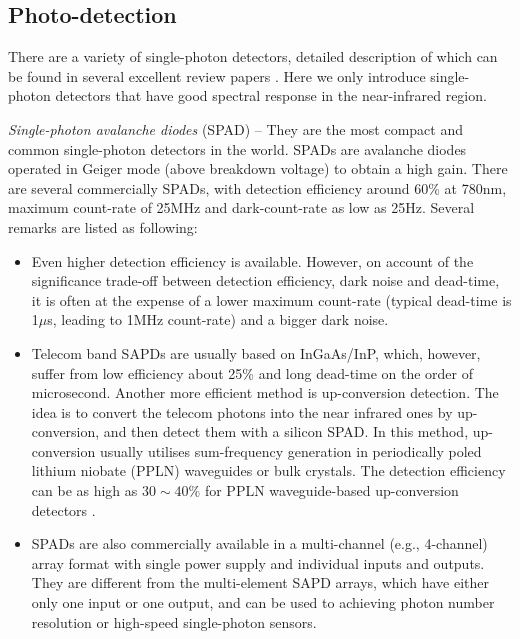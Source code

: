 %
%

\subsection{Photo-detection} 

There are a variety of single-photon detectors, detailed description of which can be found in several excellent review papers \cite{bib:eisaman2011, bib:hadfield2009}. Here we only introduce single-photon detectors that have good spectral response in the near-infrared region.

\textit{Single-photon avalanche diodes} (SPAD) -- They are the most compact and common single-photon detectors in the world. SPADs are avalanche diodes operated in Geiger mode (above breakdown voltage) to obtain a high gain. There are several commercially SPADs, with detection efficiency around 60\% at 780nm, maximum count-rate of 25MHz and dark-count-rate as low as 25Hz. Several remarks are listed as following:

\begin{itemize}
    \item Even higher detection efficiency is available. However, on account of the significance trade-off between detection efficiency, dark noise and dead-time, it is often at the expense of a lower maximum count-rate (typical dead-time is 1$\mu$s, leading to 1MHz count-rate) and a bigger dark noise.

    \item Telecom band SAPDs are usually based on InGaAs/InP, which, however, suffer from low efficiency about 25\% and long dead-time on the order of microsecond. Another more efficient method is up-conversion detection. The idea is to convert the telecom photons into the near infrared ones by up-conversion, and then detect them with a silicon SPAD. In this method, up-conversion usually utilises sum-frequency generation in periodically poled lithium niobate (PPLN) waveguides or bulk crystals. The detection efficiency can be as high as \mbox{$30\sim 40\%$} for PPLN waveguide-based up-conversion detectors \cite{bib:shentu2013ultralow}.
    \item SPADs are also commercially available in a multi-channel (e.g., 4-channel) array format with single power supply and individual inputs and outputs. They are different from the multi-element SAPD arrays, which have either only one input or one output, and can be used to achieving photon number resolution or high-speed single-photon sensors.
\end{itemize}

